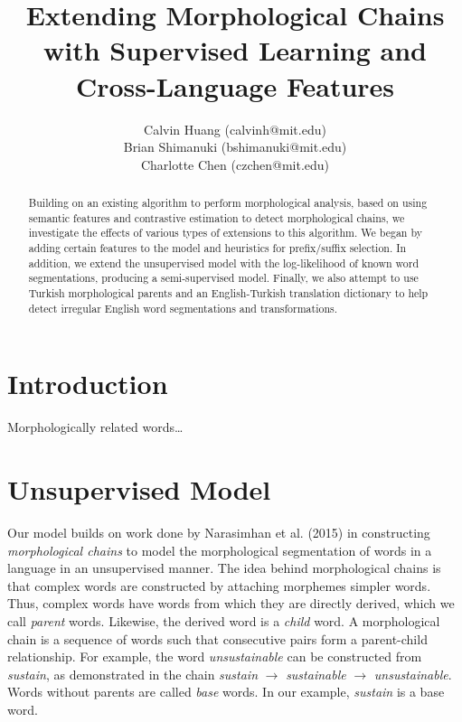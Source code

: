 \documentclass[11pt,twocolumn]{article}
\begin{document}
 
\title{Extending Morphological Chains with Supervised Learning and Cross-Language Features}

\author{Calvin Huang (calvinh@mit.edu)\\
    Brian Shimanuki (bshimanuki@mit.edu)\\
    Charlotte Chen (czchen@mit.edu)
\\
}

\maketitle
\thispagestyle{empty}

\begin{abstract}
    Building on an existing algorithm to perform morphological analysis,
    based on using semantic features and contrastive estimation to detect morphological chains,
    we investigate the effects of various types of extensions to this algorithm.
    We began by adding certain features to the model and heuristics for prefix/suffix selection.
    In addition, we extend the unsupervised model with the log-likelihood of known word segmentations,
    producing a semi-supervised model.
    Finally, we also attempt to use Turkish morphological parents and an English-Turkish translation
    dictionary to help detect irregular English word segmentations and transformations.
\end{abstract}

\section{Introduction}
Morphologically related words\dots %

\section{Unsupervised Model}
Our model builds on work done by Narasimhan et al. (2015) in constructing \emph{morphological chains} to model the morphological segmentation of words in a language in an unsupervised manner. The idea behind morphological chains is that complex words are constructed by attaching morphemes simpler words. Thus, complex words have words from which they are directly derived, which we call \emph{parent} words. Likewise, the derived word is a \emph{child} word. A morphological chain is a sequence of words such that consecutive pairs form a parent-child relationship. For example, the word \emph{unsustainable} can be constructed from \emph{sustain}, as demonstrated in the chain \emph{sustain} $\rightarrow$ \emph{sustainable} $\rightarrow$ \emph{unsustainable}. Words without parents are called \emph{base} words. In our example, \emph{sustain} is a base word.
\end{document}
